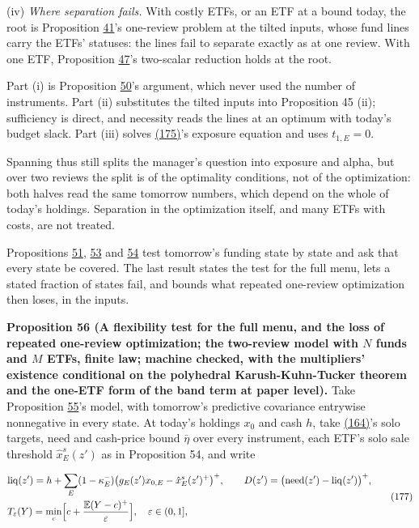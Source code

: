 \documentclass[11pt]{article}
\begin{document}
(iv) \emph{Where separation fails.} With costly ETFs, or an ETF at a bound
today, the root is Proposition \hyperref[res:Proposition-41]{41}'s one-review problem at the tilted
inputs, whose fund lines carry the ETFs' statuses: the lines fail to
separate exactly as at one review. With one ETF, Proposition \hyperref[res:Proposition-47]{47}'s
two-scalar reduction holds at the root.

Part (i) is Proposition \hyperref[res:Proposition-50]{50}'s argument, which never used the number of
instruments. Part (ii) substitutes the tilted inputs into Proposition
45 (ii); sufficiency is direct, and necessity reads the lines at an
optimum with today's budget slack. Part (iii) solves \hyperref[eq:175]{(175)}'s exposure
equation and uses \(t_{1,E}=0\).

Spanning thus still splits the manager's question into exposure and
alpha, but over two reviews the split is of the optimality conditions,
not of the optimization: both halves read the same tomorrow numbers,
which depend on the whole of today's holdings. Separation in the
optimization itself, and many ETFs with costs, are not treated.

Propositions \hyperref[res:Proposition-51]{51}, \hyperref[res:Proposition-53]{53} and \hyperref[res:Proposition-54]{54} test tomorrow's funding state by state and
ask that every state be covered. The last result states the test for
the full menu, lets a stated fraction of states fail, and bounds what
repeated one-review optimization then loses, in the inputs.

\label{res:Proposition-56}
\textbf{Proposition 56 (A flexibility test for the full menu, and the loss of repeated one-review optimization; the two-review model with \(N\) funds and \(M\) ETFs, finite law; machine checked, with the multipliers' existence conditional on the polyhedral Karush-Kuhn-Tucker theorem and the one-ETF form of the band term at paper level).}
Take Proposition \hyperref[res:Proposition-55]{55}'s model, with tomorrow's predictive covariance
entrywise nonnegative in every state. At today's holdings \(x_0\) and cash
\(h\), take \hyperref[eq:164]{(164)}'s solo targets, need and cash-price bound \(\bar\eta\) over every
instrument, each ETF's solo sale threshold \(\hat x^s_E(z')\) as in Proposition
54, and write

\begin{equation*}
\begin{aligned}
&\mathrm{liq}(z')=h+\sum_E(1-\kappa^-_E)\bigl(g_E(z')x_{0,E}-\hat x^s_E(z')^+\bigr)^+,\qquad
D(z')=\bigl(\mathrm{need}(z')-\mathrm{liq}(z')\bigr)^+,\\
&T_\varepsilon(Y)=\min_c\Bigl[c+\frac{\mathbb E(Y-c)^+}{\varepsilon}\Bigr],\quad\varepsilon\in(0,1],
\end{aligned}\tag{177}\label{eq:177}
\end{equation*}
\end{document}
